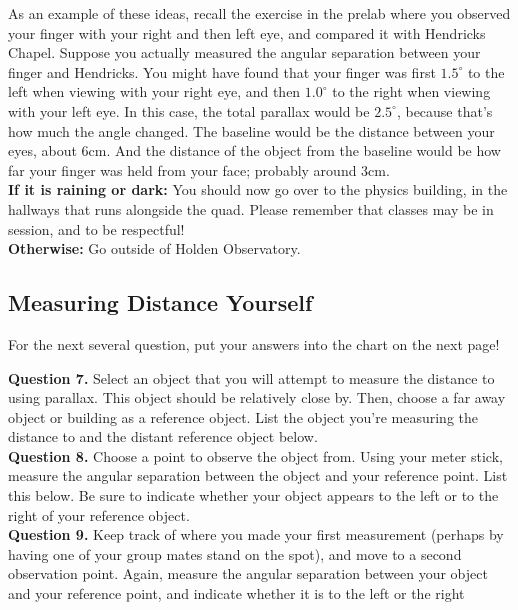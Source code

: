 \documentclass[11pt]{article}
\begin{document}
As an example of these ideas, recall the exercise in the prelab where you observed your finger with your right and then left eye, and compared it with Hendricks Chapel. Suppose you actually measured the angular separation between your finger and Hendricks. You might have found that your finger was first $1.5^\circ$ to the left when viewing with your right eye, and then $1.0^\circ$ to the right when viewing with your left eye. In this case, the total parallax would be $2.5^\circ$, because that's how much the angle changed. The baseline would be the distance between your eyes, about 6cm. And the distance of the object from the baseline would be how far your finger was held from your face; probably around 3cm. \\

\textbf{If it is raining or dark:} You should now go over to the physics building, in the hallways that runs alongside the quad. Please remember that classes may be in session, and to be respectful!\\

\textbf{Otherwise:} Go outside of Holden Observatory.

\newpage

\subsection{Measuring Distance Yourself}
For the next several question, put your answers into the chart on the next page!

\textbf{Question 7.} Select an object that you will attempt to measure the distance to using parallax. This object should be relatively close by. Then, choose a far away object or building as a reference object. List the object you're measuring the distance to and the distant reference object below.\\

\textbf{Question 8.} Choose a point to observe the object from. Using your meter stick, measure the angular separation between the object and your reference point. List this below. Be sure to indicate whether your object appears to the left or to the right of your reference object.\\

\textbf{Question 9.} Keep track of where you made your first measurement (perhaps by having one of your group mates stand on the spot), and move to a second observation point. Again, measure the angular separation between your object and your reference point, and indicate whether it is to the left or the right\\
\end{document}
